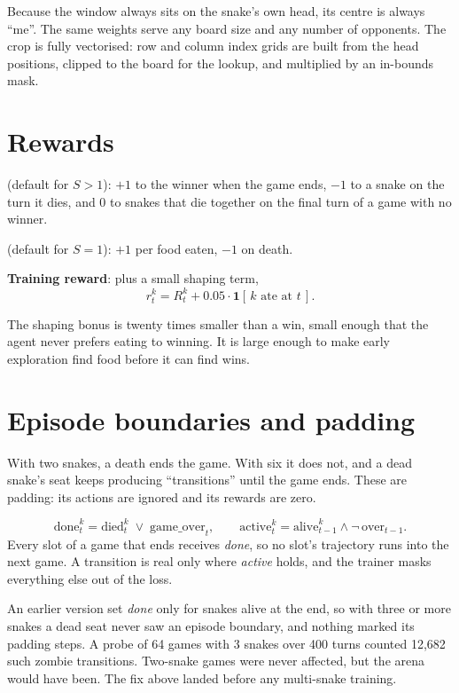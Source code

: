 Because the window always sits on the snake's own head, its centre is always ``me''. The
same weights serve any board size and any number of opponents. The crop is fully
vectorised: row and column index grids are built from the head positions, clipped to the
board for the lookup, and multiplied by an in-bounds mask.

\section{Rewards}

\begin{defbox}
\textbf{} (default for $S>1$): $+1$ to the winner when the game ends,
$-1$ to a snake on the turn it dies, and $0$ to snakes that die together on the final
turn of a game with no winner.

\textbf{} (default for $S=1$): $+1$ per food eaten, $-1$ on death.

\textbf{Training reward}:  plus a small shaping term,
\[
  r_t^k = R^k_t + 0.05\cdot\mathbf{1}[\,k \text{ ate at } t\,].
\]
\end{defbox}

The shaping bonus is twenty times smaller than a win, small enough that the agent never
prefers eating to winning. It is large enough to make early exploration find food before
it can find wins.

\section{Episode boundaries and padding}

With two snakes, a death ends the game. With six it does not, and a dead snake's seat
keeps producing ``transitions'' until the game ends. These are padding: its actions are
ignored and its rewards are zero.

\begin{defbox}
\[
  \text{done}^k_t = \text{died}^k_t \;\vee\; \text{game\_over}_t,
  \qquad
  \text{active}^k_t = \text{alive}^k_{t-1}\wedge \neg\,\text{over}_{t-1}.
\]
Every slot of a game that ends receives \emph{done}, so no slot's trajectory runs into the
next game. A transition is real only where \emph{active} holds, and the trainer masks
everything else out of the loss.
\end{defbox}

\begin{warnbox}
An earlier version set \emph{done} only for snakes alive at the end, so with three or more
snakes a dead seat never saw an episode boundary, and nothing marked its padding steps.
A probe of 64 games with 3 snakes over 400 turns counted 12{,}682 such zombie
transitions. Two-snake games were never affected, but the arena would have been. The
fix above landed before any multi-snake training.
\end{warnbox}

